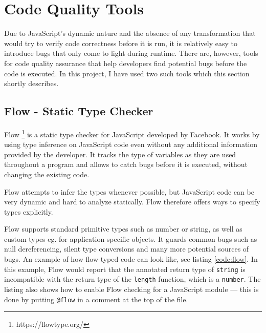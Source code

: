 \section{Code Quality Tools}

Due to JavaScript's dynamic nature and the absence of any transformation that would try to verify code correctness before it is run, it is relatively easy to introduce bugs that only come to light during runtime. There are, however, tools for code quality assurance that help developers find potential bugs before the code is executed. In this project, I have used two such tools which this section shortly describes.

\subsection{Flow - Static Type Checker}

Flow  \footnote{https://flowtype.org/} is a static type checker for JavaScript developed by Facebook. It works by using type inference on JavaScript code even without any additional information provided by the developer. It tracks the type of variables as they are used throughout a program and allows to catch bugs before it is executed, without changing the existing code. 

Flow attempts to infer the types whenever possible, but JavaScript code can be very dynamic and hard to analyze statically. Flow therefore offers ways to specify types explicitly.

Flow supports standard primitive types such as number or string, as well as custom types eg. for application-specific objects. It guards common bugs such as null dereferencing, silent type conversions and many more potential sources of bugs. An example of how flow-typed code can look like, see listing \ref{code:flow}. In this example, Flow would report that the annotated return type of \texttt{string} is incompatible with the return type of the \texttt{length} function, which is a \texttt{number}. The listing also shows how to enable Flow checking for a JavaScript module --- this is done by putting \texttt{@flow} in a comment at the top of the file.







